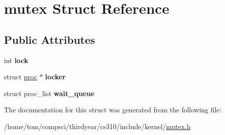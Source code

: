 \hypertarget{structmutex}{}\section{mutex Struct Reference}
\label{structmutex}
\subsection*{Public Attributes}
\begin{DoxyCompactItemize}
\item 
\mbox{\label{structmutex_a99aad46a172a35974aac3981e206e035}} 
int {\bfseries lock}
\item 
\mbox{\label{structmutex_a7be3bdb872b0dc4026f65cac4ac4ef44}} 
struct \mbox{\hyperlink{structproc}{proc}} $\ast$ {\bfseries locker}
\item 
\mbox{\label{structmutex_ae11af2f8a6e11fb653f0c925878be9a9}} 
struct proc\+\_\+list {\bfseries wait\+\_\+queue}
\end{DoxyCompactItemize}


The documentation for this struct was generated from the following file\+:\begin{DoxyCompactItemize}
\item 
/home/tom/compsci/thirdyear/cs310/include/kernel/\mbox{\hyperlink{mutex_8h}{mutex.\+h}}\end{DoxyCompactItemize}
